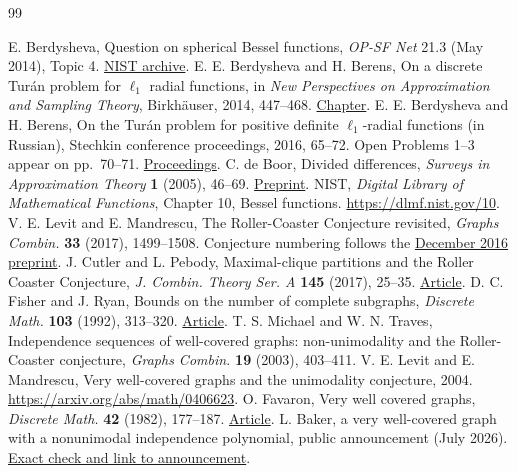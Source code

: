 \documentclass[11pt,a4paper]{article}
\theoremstyle{remark}\newtheorem{remark}[theorem]{Remark}
\numberwithin{equation}{section}
\begin{document}
\begin{thebibliography}{99}

 E. Berdysheva, Question on spherical Bessel functions, \emph{OP-SF Net} 21.3 (May 2014), Topic 4. \href{https://math.nist.gov/~DLozier/OPSFnet/OPSF-Net_21-3.pdf}{NIST archive}.
 E. E. Berdysheva and H. Berens, On a discrete Tur\'an problem for $\ell_1$ radial functions, in \emph{New Perspectives on Approximation and Sampling Theory}, Birkh\"auser, 2014, 447--468. \href{https://doi.org/10.1007/978-3-319-08801-3_19}{Chapter}.
 E. E. Berdysheva and H. Berens, On the Tur\'an problem for positive definite $\ell_1$-radial functions (in Russian), Stechkin conference proceedings, 2016, 65--72. Open Problems 1--3 appear on pp.~70--71. \href{https://ir.duan.edu.ua/server/api/core/bitstreams/fdaadc5f-8619-438f-a679-98a574d5aaca/content}{Proceedings}.
 C. de Boor, Divided differences, \emph{Surveys in Approximation Theory} \textbf{1} (2005), 46--69. \href{https://arxiv.org/abs/math/0502036}{Preprint}.
 NIST, \emph{Digital Library of Mathematical Functions}, Chapter 10, Bessel functions. \url{https://dlmf.nist.gov/10}.
 V. E. Levit and E. Mandrescu, The Roller-Coaster Conjecture revisited, \emph{Graphs Combin.} \textbf{33} (2017), 1499--1508. Conjecture numbering follows the \href{https://arxiv.org/abs/1612.03736}{December 2016 preprint}.
 J. Cutler and L. Pebody, Maximal-clique partitions and the Roller Coaster Conjecture, \emph{J. Combin. Theory Ser. A} \textbf{145} (2017), 25--35. \href{https://doi.org/10.1016/j.jcta.2016.06.019}{Article}.
 D. C. Fisher and J. Ryan, Bounds on the number of complete subgraphs, \emph{Discrete Math.} \textbf{103} (1992), 313--320. \href{https://doi.org/10.1016/0012-365X(92)90323-8}{Article}.
 T. S. Michael and W. N. Traves, Independence sequences of well-covered graphs: non-unimodality and the Roller-Coaster conjecture, \emph{Graphs Combin.} \textbf{19} (2003), 403--411.
 V. E. Levit and E. Mandrescu, Very well-covered graphs and the unimodality conjecture, 2004. \url{https://arxiv.org/abs/math/0406623}.
 O. Favaron, Very well covered graphs, \emph{Discrete Math.} \textbf{42} (1982), 177--187. \href{https://doi.org/10.1016/0012-365X(82)90215-1}{Article}.
 L. Baker, a very well-covered graph with a nonunimodal independence polynomial, public announcement (July 2026). \href{https://aiproofwatch.com/updates/a-very-well-covered-graph-with-a-nonunimodal-independence-polynomial-bc5e7b0b}{Exact check and link to announcement}.

\end{thebibliography}
\end{document}
